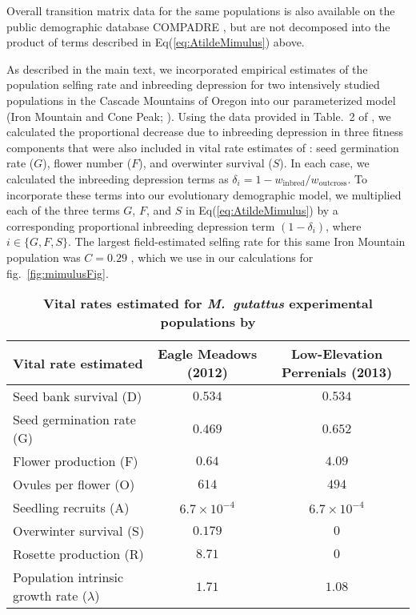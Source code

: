 \documentclass[11pt]{article}
\begin{document}
Overall transition matrix data for the same populations is also available on the public demographic database COMPADRE \citep{CompadreDB2020}, but are not decomposed into the product of terms described in Eq(\ref{eq:AtildeMimulus}) above.

As described in the main text, we incorporated empirical estimates of the population selfing rate and inbreeding depression for two intensively studied populations in the Cascade Mountains of Oregon into our parameterized model (Iron Mountain and Cone Peak; \citealt{Willis1993,Willis1999a,Willis1999b}). Using the data provided in Table.~2 of \citet{Willis1993}, we calculated the proportional decrease due to inbreeding depression in three fitness components that were also included in vital rate estimates of \citet{PetersonEtAl2016}: seed germination rate ($G$), flower number ($F$), and overwinter survival ($S$). In each case, we calculated the inbreeding depression terms as $\delta_i = 1 - w_{\text{inbred}}/w_{\text{outcross}}$. To incorporate these terms into our evolutionary demographic model, we multiplied each of the three terms $G$, $F$, and $S$ in Eq(\ref{eq:AtildeMimulus}) by a corresponding proportional inbreeding depression term $(1 - \delta_i)$, where $i \in \{ G,F,S\}$. The largest field-estimated selfing rate for this same Iron Mountain population was $C = 0.29$ \citep{Willis1993}, which we use in our calculations for fig.~\ref{fig:mimulusFig}.


\begin{table}[htbp]
 \centering
 \caption{\bf Vital rates estimated for {\itshape M.~gutattus} experimental populations by \citet{PetersonEtAl2016}}
\label{tab:MimDemData}
\begin{tabular}{lcc}
 \toprule
 Vital rate estimated &  Eagle Meadows (2012) & Low-Elevation Perrenials (2013)\\ \hline
 Seed bank survival (D) & $0.534$ & $0.534$ \\
 Seed germination rate (G) & $0.469$ & $0.652$ \\
 Flower production (F) & $0.64$ & $4.09$ \\
 Ovules per flower (O) & $614$ & $494$ \\
 Seedling recruits (A) & $6.7 \times 10^{-4}$ & $6.7 \times 10^{-4}$ \\
 Overwinter survival (S) & $0.179$ & $0$ \\
 Rosette production (R) & $8.71$ & $0$ \\
\hline
 Population intrinsic growth rate ($\lambda$) & $1.71$ & $1.08$ \\
 \hline
\end{tabular}
\end{table}
\end{document}
